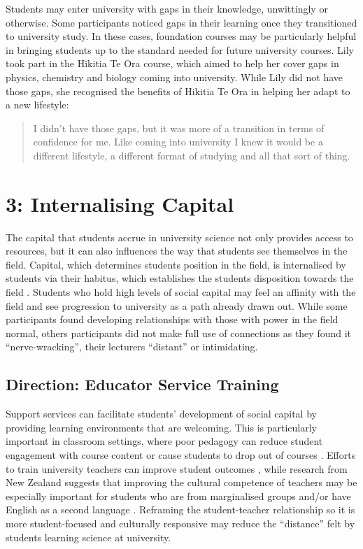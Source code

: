 Students may enter university with gaps in their knowledge, unwittingly or otherwise. Some participants noticed gaps in their learning once they transitioned to university study. In these cases, foundation courses may be particularly helpful in bringing students up to the standard needed for future university courses. Lily took part in the Hikitia Te Ora course, which aimed to help her cover gaps in physics, chemistry and biology coming into university. While Lily did not have those gaps, she recognised the benefits of Hikitia Te Ora in helping her adapt to a new lifestyle: \blockquote{I didn't have those gaps, but it was more of a transition in terms of confidence for me. Like coming into university I knew it would be a different lifestyle, a different format of studying and all that sort of thing.}






\section{3: Internalising Capital}
The capital that students accrue in university science not only provides access to resources, but it can also influences the way that students see themselves in the field. Capital, which determines students position in the field, is internalised by students via their habitus, which establishes the students disposition towards the field \cite{Bourdieu1992}. Students who hold high levels of social capital may feel an affinity with the field and see progression to university as a path already drawn out. While some participants found developing relationships with those with power in the field normal, others participants did not make full use of connections as they found it ``nerve-wracking'', their lecturers ``distant'' or intimidating. 


\subsection{Direction: Educator Service Training}
Support services can facilitate students' development of social capital by providing learning environments that are welcoming. This is particularly important in classroom settings, where poor pedagogy can reduce student engagement with course content or cause students to  drop out of courses \cite{russell2011factors}. Efforts to train university teachers can improve student outcomes \cite{gibbs2004impact}, while research from New Zealand suggests that improving the cultural competence of teachers may be especially important for students who are from marginalised groups \cite{ikiua2019pasifika} and/or have English as a second language \cite{campbell2008asian}. Reframing the student-teacher relationship so it is more student-focused \cite{gibbs2004impact} and culturally responsive \cite{ikiua2019pasifika} may reduce the ``distance'' felt by students learning science at university.  

